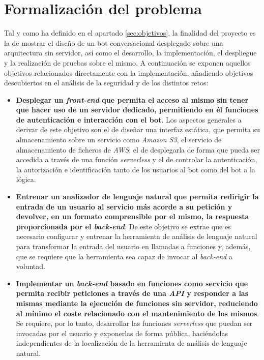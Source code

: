 \documentclass[11pt,spanish,listoffigures]{tfgetsinf}
\begin{document}

\section{Formalización del problema}
\label{sec:formalizacion}

Tal y como ha definido en el apartado \ref{sec:objetivos}, la finalidad del proyecto es la de mostrar el diseño de un bot conversacional desplegado sobre una arquitectura sin servidor, así como el desarrollo, la implementación, el despliegue y la realización de pruebas sobre el mismo. A continuación se exponen aquellos objetivos relacionados directamente con la implementación, añadiendo objetivos descubiertos en el análisis de la seguridad y de los distintos retos:

\begin{itemize}
\item \textbf{Desplegar un \textit{front-end} que permita el acceso al mismo sin tener que hacer uso de un servidor dedicado, permitiendo en él funciones de autenticación e interacción con el bot}. Los aspectos generales a derivar de este objetivo son el de diseñar una interfaz estática, que permita su almacenamiento sobre un servicio como \textit{Amazon S3}, el servicio de almacenamiento de ficheros de \textit{AWS}; el de desplegarla de forma que pueda ser accedida a través de una función \textit{serverless} y el de controlar la autenticación, la autorización e identificación tanto de los usuarios al bot como del bot a la lógica.

\item \textbf{Entrenar un analizador de lenguaje natural que permita redirigir la entrada de un usuario al servicio más acorde a su petición y devolver, en un formato comprensible por el mismo, la respuesta proporcionada por el \textit{back-end}}. De este objetivo se extrae que es necesario configurar y entrenar la herramienta de análisis de lenguaje natural para transformar la entrada del usuario en llamadas a funciones y, además, que se requiere que la herramienta sea capaz de invocar al \textit{back-end} a voluntad.

\item \textbf{Implementar un \textit{back-end} basado en funciones como servicio que permita recibir peticiones a través de una \textit{API} y responder a las mismas mediante la ejecución de funciones sin servidor, reduciendo al mínimo el coste relacionado con el mantenimiento de los mismos}. Se requiere, por lo tanto, desarrollar las funciones \textit{serverless} que puedan ser invocadas por el usuario y exponerlas de forma pública, haciéndolas independientes de la localización de la herramienta de análisis de lenguaje natural.
\end{itemize}
\end{document}
